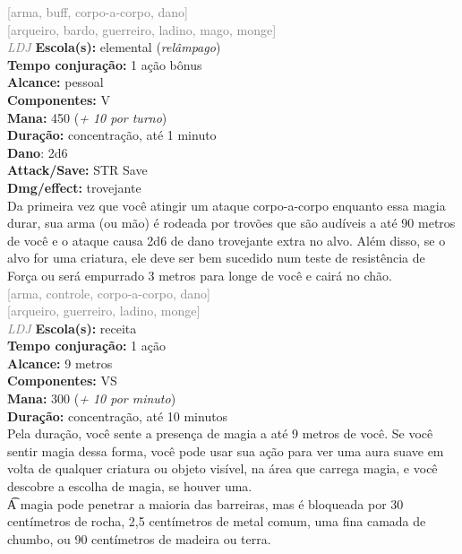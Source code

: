 \documentclass{RPG_Adventure}[2021/10/20]
\begin{document}
{\scriptsize \textcolor{gray}{[arma, buff, corpo-a-corpo, dano]\\}}
{\scriptsize \textcolor{gray}{[arqueiro, bardo, guerreiro, ladino, mago, monge]\\}}
{\tiny \textcolor{gray}{\textit{LDJ}}}\jump{}
{\small \t \textbf{Escola(s):} elemental (\textit{relâmpago})\\\t \textbf{Tempo conjuração:} 1 ação bônus\\\t \textbf{Alcance:} pessoal\\\t \textbf{Componentes:} V\\\t \textbf{Mana:} 450 (\textit{+ 10 por turno})\\\t \textbf{Duração:} concentração, até 1 minuto\\\t \textbf{Dano}: 2d6\\\t \textbf{Attack/Save:} STR Save\\\t \textbf{Dmg/effect:} trovejante\\}
{\normalsize Da primeira vez que você atingir um ataque corpo-a-corpo enquanto essa magia durar, sua arma (ou mão) é rodeada por trovões que são audíveis a até 90 metros de você e o ataque causa 2d6 de dano trovejante extra no alvo. Além disso, se o alvo for uma criatura, ele deve ser bem sucedido num teste de resistência de Força ou será empurrado 3 metros para longe de você e cairá no chão.\\}
{\scriptsize \textcolor{gray}{[arma, controle, corpo-a-corpo, dano]\\}}
{\scriptsize \textcolor{gray}{[arqueiro, guerreiro, ladino, monge]\\}}
{\tiny \textcolor{gray}{\textit{LDJ}}}\jump{}
{\small \t \textbf{Escola(s):} receita\\\t \textbf{Tempo conjuração:} 1 ação\\\t \textbf{Alcance:} 9 metros\\\t \textbf{Componentes:} VS\\\t \textbf{Mana:} 300 (\textit{+ 10 por minuto})\\\t \textbf{Duração:} concentração, até 10 minutos\\}
{\normalsize Pela duração, você sente a presença de magia a até 9 metros de você. Se você sentir magia dessa forma, você pode usar sua ação para ver uma aura suave em volta de qualquer criatura ou objeto visível, na área que carrega magia, e você descobre a escolha de magia, se houver uma.\\\t A magia pode penetrar a maioria das barreiras, mas é bloqueada por 30 centímetros de rocha, 2,5 centímetros de metal comum, uma fina camada de chumbo, ou 90 centímetros de madeira ou terra.\\}
\end{document}
